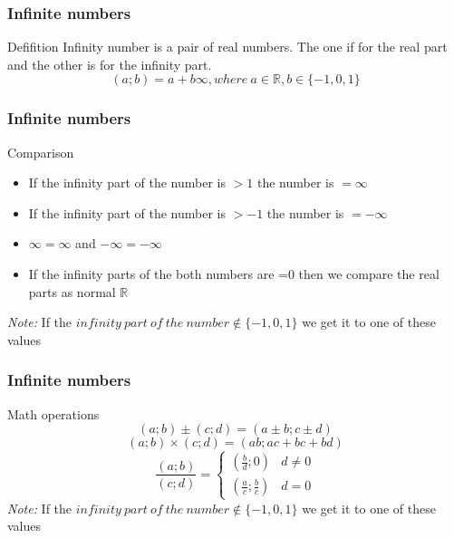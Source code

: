 \documentclass[12pt]{beamer}
\begin{document}
	\begin{frame}
		\frametitle{Infinite numbers}
		\begin{block}{Defifition}
			Infinity number is a pair of real numbers. The one if for the real part and the other is for the infinity part.
			$$(a; b) = a + b\infty, where\ a \in \mathbb{R}, b \in \{-1, 0, 1\}$$
		\end{block}
	\end{frame}

	\begin{frame}
		\frametitle{Infinite numbers}
		\begin{block}{Comparison}
			\begin{itemize}
				\item If the infinity part of the number is $>1$ the number is $=\infty$
				\item If the infinity part of the number is $>-1$ the number is $=-\infty$
				\item $\infty = \infty$ and $-\infty = -\infty$
				\item If the infinity parts of the both numbers are =0 then we compare the real parts as normal $\mathbb{R}$
			\end{itemize}
			\small{\textit{Note:} If the $infinity\ part\ of\ the\ number \notin \{-1, 0, 1\}$ we get it to one of these values}
		\end{block}
	\end{frame}

	\begin{frame}
		\frametitle{Infinite numbers}
		\begin{block}{Math operations}
			$$(a; b) \pm (c; d) = (a \pm b; c \pm d)$$
			$$(a; b) \times (c; d) = (ab; ac + bc + bd)$$
			\[ \frac{(a; b)}{(c; d)} = 
				\begin{cases}
					(\frac{b}{d}; 0)           & d \neq 0\\
					(\frac{a}{c}; \frac{b}{c}) & d = 0
				\end{cases} 
            \]   
			\small{\textit{Note:} If the $infinity\ part\ of\ the\ number \notin \{-1, 0, 1\}$ we get it to one of these values}
		\end{block}
	\end{frame}
\end{document}
